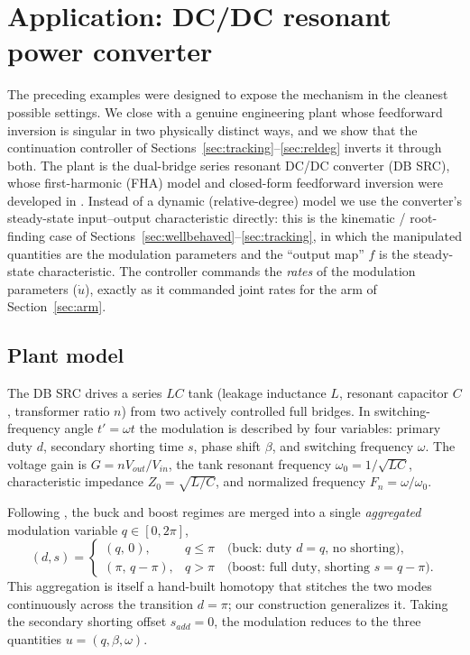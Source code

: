 \documentclass[11pt,american]{article}
\theoremstyle{definition}
\theoremstyle{plain}
\theoremstyle{remark}
\begin{document}
\section{Application: DC/DC resonant power converter}\label{sec:converter}

The preceding examples were designed to expose the mechanism in the cleanest possible settings. We close with a genuine engineering plant whose feedforward inversion is singular in two physically distinct ways, and we show that the continuation controller of Sections~\ref{sec:tracking}--\ref{sec:reldeg} inverts it through both. The plant is the dual-bridge series resonant DC/DC converter (DB SRC), whose first-harmonic (FHA) model and closed-form feedforward inversion were developed in \cite{Borisevich2020SRC}. Instead of a dynamic (relative-degree) model we use the converter's steady-state input--output characteristic directly: this is the kinematic / root-finding case of Sections~\ref{sec:wellbehaved}--\ref{sec:tracking}, in which the manipulated quantities are the modulation parameters and the ``output map'' $f$ is the steady-state characteristic. The controller commands the \emph{rates} of the modulation parameters ($\dot u$), exactly as it commanded joint rates for the arm of Section~\ref{sec:arm}.

\subsection{Plant model}

The DB SRC drives a series $LC$ tank (leakage inductance $L$, resonant capacitor $C$, transformer ratio $n$) from two actively controlled full bridges. In switching-frequency angle $t' = \omega t$ the modulation is described by four variables: primary duty $d$, secondary shorting time $s$, phase shift $\beta$, and switching frequency $\omega$. The voltage gain is $G = n V_{out}/V_{in}$, the tank resonant frequency $\omega_0 = 1/\sqrt{LC}$, characteristic impedance $Z_0 = \sqrt{L/C}$, and normalized frequency $F_n = \omega/\omega_0$.

Following \cite{Borisevich2020SRC}, the buck and boost regimes are merged into a single \emph{aggregated} modulation variable $q \in [0, 2\pi]$,
\begin{equation}\label{eq:pe_q}
(d,s) = \begin{cases} (q,\,0), & q \le \pi \quad\text{(buck: duty $d=q$, no shorting)},\\[2pt] (\pi,\,q-\pi), & q > \pi \quad\text{(boost: full duty, shorting $s=q-\pi$)}. \end{cases}
\end{equation}
This aggregation is itself a hand-built homotopy that stitches the two modes continuously across the transition $d=\pi$; our construction generalizes it. Taking the secondary shorting offset $s_{add}=0$, the modulation reduces to the three quantities $u=(q,\beta,\omega)$.
\end{document}
